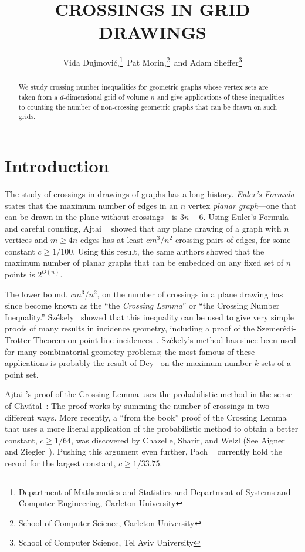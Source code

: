 \documentclass{patmorin}
\title{\MakeUppercase{Crossings in Grid Drawings}}
\author{Vida Dujmovi\'c,\thanks{Department of Mathematics and Statistics
and Department of Systems and Computer Engineering, Carleton University}\, Pat Morin,\thanks{School of Computer Science, Carleton University}\, and 
Adam Sheffer\thanks{School of Computer Science, Tel Aviv University}}
\begin{document}
\maketitle

\begin{abstract}
   We study crossing number inequalities for geometric graphs whose
   vertex sets are taken from a $d$-dimensional grid of volume $n$
   and give applications of these inequalities to counting the number
   of non-crossing geometric graphs that can be drawn on such grids.
\end{abstract}

\section{Introduction}

The study of crossings in drawings of graphs has a long history.
\emph{Euler's Formula} states that the maximum number of edges in an $n$
vertex \emph{planar graph}---one that can be drawn in the plane without
crossings---is $3n-6$.  Using Euler's Formula and careful counting, Ajtai
\etal~\cite{ajtai.chvatal.ea:crossing-free} showed that any plane drawing
of a graph with $n$ vertices and $m\ge 4n$ edges has at least $c m^3/n^2$
crossing pairs of edges, for some constant $c\ge 1/100$.  Using this
result, the same authors showed that the maximum number of planar graphs
that can be embedded on any fixed set of $n$ points is $2^{O(n)}$.

The lower bound, $cm^3/n^2$, on the number of crossings
in a plane drawing has since become known as the ``the
\emph{Crossing Lemma}'' or ``the Crossing Number Inequality.''
Sz\'ekely~\cite{szekely:crossing} showed that this inequality can be
used to give very simple proofs of many results in incidence geometry,
including a proof of the Szemer\'edi-Trotter Theorem on point-line
incidences~\cite{szemeredi.trotter:extremal}.  Sz\'ekely's method has
since been used for many combinatorial geometry problems; the most famous
of these applications is probably the result of Dey~\cite{dey:improved}
on the maximum number $k$-sets of a point set.

Ajtai \etal's proof of the Crossing Lemma uses the probabilistic method
in the sense of Chv\'atal~\cite{chvatal:hypergraphs}: The proof works by
summing the number of crossings in two different ways.  More recently, a
``from the book'' proof of the Crossing Lemma that uses a more literal
application of the probabilistic method to obtain a better constant,
$c\ge 1/64$, was discovered by Chazelle, Sharir, and Welzl (See Aigner
and Ziegler~\cite[Chapter~30, Theorem~4]{aigner.ziegler:proofs}).  Pushing
this argument even further, Pach \etal~\cite{pach.radoicic.ea:improving}
currently hold the record for the largest constant, $c\ge 1/33.75$.
\end{document}
